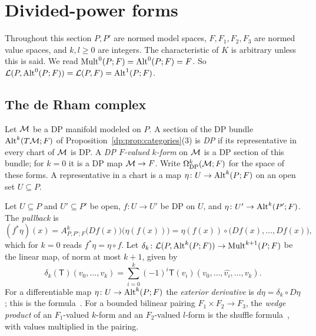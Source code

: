 \section{Divided-power forms}\label{dp:sec:forms}

Throughout this section $P,P'$ are normed model spaces, $F,F_1,F_2,F_3$ are normed value spaces, and $k,l\ge0$ are integers. The characteristic of $K$ is arbitrary unless this is said. We read $\operatorname{Mult}^0(P;F)=\operatorname{Alt}^0(P;F)=F$. So $\mathcal L(P,\operatorname{Alt}^0(P;F))=\mathcal L(P,F)=\operatorname{Alt}^1(P;F)$.

\subsection{The de Rham complex}\label{dp:ssec:de-rham}

Let $\mathcal M$ be a DP manifold modeled on $P$. A section of the DP bundle $\operatorname{Alt}^k(T\mathcal M;F)$ of Proposition~\ref{dp:prop:categories}(3) is \emph{DP} if its representative in every chart of $\mathcal M$ is DP. A \emph{DP $F$-valued $k$-form} on $\mathcal M$ is a DP section of this bundle; for $k=0$ it is a DP map $\mathcal M\to F$. Write $\Omega^k_{\mathrm{DP}}(\mathcal M;F)$ for the space of these forms. A representative in a chart is a map $\eta\colon U\to\operatorname{Alt}^k(P;F)$ on an open set $U\subseteq P$.

Let $U\subseteq P$ and $U'\subseteq P'$ be open, $f\colon U\to U'$ be DP on $U$, and $\eta\colon U'\to\operatorname{Alt}^k(P';F)$. The \emph{pullback} is
\begin{equation}\label{dp:f:pullback}
 (f^*\eta)(x)=A^k_{P,P';F}\bigl(Df(x)\bigr)\bigl(\eta(f(x))\bigr)=\eta(f(x))\circ\bigl(Df(x),\dots,Df(x)\bigr),
\end{equation}
which for $k=0$ reads $f^*\eta=\eta\circ f$. Let $\delta_k\colon\mathcal L(P,\operatorname{Alt}^k(P;F))\to\operatorname{Mult}^{k+1}(P;F)$ be the linear map, of norm at most $k+1$, given by
\[
 \delta_k(\mathsf T)(v_0,\dots,v_k)=\sum_{i=0}^k(-1)^i\mathsf T(v_i)(v_0,\dots,\widehat{v_i},\dots,v_k).
\]
For a differentiable map $\eta\colon U\to\operatorname{Alt}^k(P;F)$ the \emph{exterior derivative} is $d\eta=\delta_k\circ D\eta$; this is the formula~\cite[(10.3)]{I}. For a bounded bilinear pairing $F_1\times F_2\to F_3$, the \emph{wedge product} of an $F_1$-valued $k$-form and an $F_2$-valued $l$-form is the shuffle formula~\cite[(10.2)]{I}, with values multiplied in the pairing.

